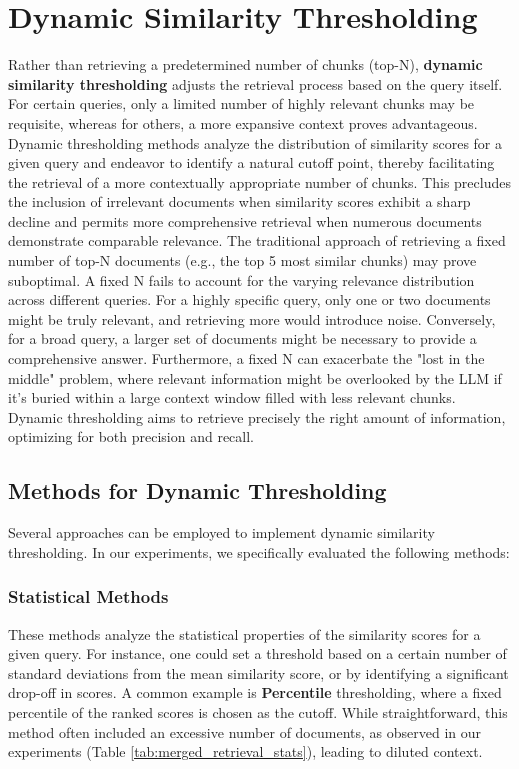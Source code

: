 \section{Dynamic Similarity Thresholding}
Rather than retrieving a predetermined number of chunks (top-N), \textbf{dynamic similarity thresholding} adjusts the retrieval process based on the query itself. For certain queries, only a limited number of highly relevant chunks may be requisite, whereas for others, a more expansive context proves advantageous. Dynamic thresholding methods analyze the distribution of similarity scores for a given query and endeavor to identify a natural cutoff point, thereby facilitating the retrieval of a more contextually appropriate number of chunks. This precludes the inclusion of irrelevant documents when similarity scores exhibit a sharp decline and permits more comprehensive retrieval when numerous documents demonstrate comparable relevance. The traditional approach of retrieving a fixed number of top-N documents (e.g., the top 5 most similar chunks) may prove suboptimal. A fixed N fails to account for the varying relevance distribution across different queries. For a highly specific query, only one or two documents might be truly relevant, and retrieving more would introduce noise. Conversely, for a broad query, a larger set of documents might be necessary to provide a comprehensive answer. Furthermore, a fixed N can exacerbate the "lost in the middle" problem, where relevant information might be overlooked by the LLM if it's buried within a large context window filled with less relevant chunks. Dynamic thresholding aims to retrieve precisely the right amount of information, optimizing for both precision and recall.

\subsection{Methods for Dynamic Thresholding}
Several approaches can be employed to implement dynamic similarity thresholding. In our experiments, we specifically evaluated the following methods:

\subsubsection{Statistical Methods}
These methods analyze the statistical properties of the similarity scores for a given query. For instance, one could set a threshold based on a certain number of standard deviations from the mean similarity score, or by identifying a significant drop-off in scores. A common example is \textbf{Percentile} thresholding, where a fixed percentile of the ranked scores is chosen as the cutoff. While straightforward, this method often included an excessive number of documents, as observed in our experiments (Table \ref{tab:merged_retrieval_stats}), leading to diluted context.

